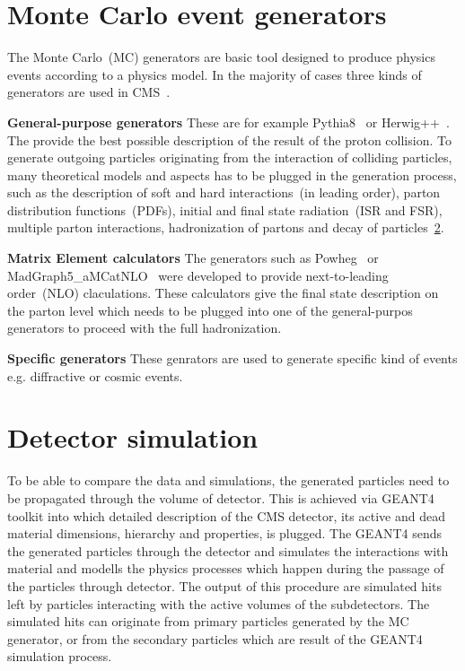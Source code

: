 
\section{Monte Carlo event generators}

The Monte Carlo~(MC) generators are basic tool designed to produce physics events according to a physics model. In the majority of cases three kinds of generators are used in CMS~\cite{website:generation, website:generationIntro}. 

\textbf{General-purpose generators}
These are for example Pythia8~\cite{Sjostrand:2014zea} or Herwig++~\cite{Bahr:2008pv}. The provide the best possible description of the result of the proton collision. To generate outgoing particles originating from the interaction of colliding particles, many theoretical models and aspects has to be plugged in the generation process, such as the description of soft and hard interactions~(in leading order), parton distribution functions~(PDFs), initial and final state radiation~(ISR and FSR), multiple parton interactions, hadronization of partons and decay of particles~\ref{}.

\textbf{Matrix Element calculators}
The generators such as Powheg~\cite{Oleari:2010nx} or MadGraph5\_aMCatNLO~\cite{Alwall:2014hca} were developed to provide next-to-leading order~(NLO) claculations. These calculators give the final state description on the parton level which needs to be plugged into one of the general-purpos generators to proceed with  the full hadronization.

\textbf{Specific generators}
These genrators are used to generate specific kind of events e.g. diffractive or cosmic events.


\section{Detector simulation}

To be able to compare the data and simulations, the generated particles need  to be propagated through the volume of detector. This is achieved via GEANT4~\cite{Agostinelli:2002hh ,Lefebure:1999wja} toolkit into which detailed description of the CMS detector, its active and dead material dimensions, hierarchy and properties, is plugged. The GEANT4 sends the generated particles through the detector and simulates the interactions with material and modells the physics processes which happen during the passage of the particles through detector. The output of this procedure are simulated hits left by particles interacting with the active volumes of the subdetectors. The simulated hits can originate from primary particles generated by the MC generator, or from the secondary particles which are result of the GEANT4 simulation process.

